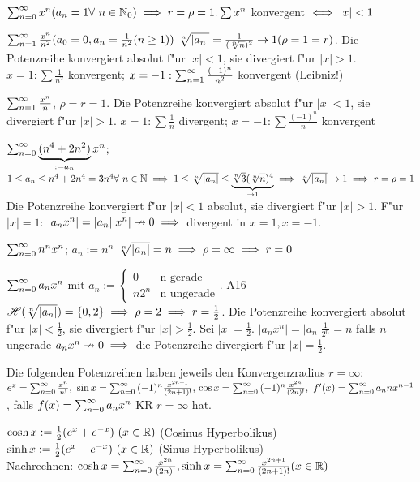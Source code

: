 \documentclass[a4paper,twoside,DIV15,BCOR12mm]{scrbook}
\begin{document}
\begin{beispiele}
\item $\reihenull{x^n} (a_n=1\forall\ n\in\MdN_0)\folgt r=\rho=1. \sum{x^n}$ konvergent $\iff |x|<1$
\item $\sum_{n=1}^{\infty}{\frac{x^n}{n^2}} (a_0=0, a_n=\frac{1}{n^2} (n\ge1))\ \sqrt[n]{|a_n|}=\frac{1}{(\sqrt[n]{n})^2} \to 1 (\rho=1=r)$. Die Potenzreihe konvergiert absolut f"ur $|x|<1$, sie divergiert f"ur $|x|>1$. $x=1: \sum\frac{1}{n^2}$ konvergent; $x=-1: \sum_{n=1}^{\infty}{\frac{(-1)^n}{n^2}}$ konvergent (Leibniz!)
\item $\sum_{n=1}^{\infty}{\frac{x^n}{n}}$, $\rho=r=1$. Die Potenzreihe konvergiert absolut f"ur $|x|<1$, sie divergiert f"ur $|x|>1$. $x=1: \sum{\frac{1}{n}}$ divergent; $x=-1: \sum{\frac{(-1)^n}{n}}$ konvergent
\item $\sum_{n=0}^{\infty}{\underbrace{(n^4+2n^2)}_{:=a_n}x^n}$; $1\le a_n \le n^4+2n^4=3n^4 \forall\ n\in\mathbb{N} \implies 1\le \sqrt[n]{|a_n|} \le \underbrace{\sqrt[n]{3}(\sqrt[n]{n})^4}_{\to 1}
\implies \sqrt[n]{|a_n|} \to 1 \implies r=\rho=1$ Die Potenzreihe konvergiert f"ur $|x|<1$ absolut, sie divergiert f"ur $|x|>1$. F"ur $|x|=1$: $|a_nx^n|=|a_n||x^n| \nrightarrow 0 \implies $ divergent in $x=1, x=-1$.
\item $\sum_{n=0}^{\infty}{n^nx^n}$; $a_n:=n^n$ $\sqrt[n]{|a_n|}=n \implies \rho=\infty \implies r=0$
\item $\sum_{n=0}^{\infty}{a_nx^n}$ mit $a_n:=\begin{cases}
0&\text{n gerade}\\
n2^n&\text{n ungerade}\end{cases}$. A16 \folgt $\mathscr{H}(\sqrt[n]{|a_n|})=\{0, 2\}
\implies \rho=2 \implies r=\frac{1}{2}$. Die Potenzreihe konvergiert absolut f"ur $|x|<\frac{1}{2}$, sie divergiert f"ur $|x|>\frac{1}{2}$. Sei $|x|=\frac{1}{2}$. $|a_nx^n|=|a_n|\frac{1}{2^n}=n$ falls $n$ ungerade \folgt $a_nx^n \nrightarrow 0 \implies$ die Potenzreihe divergiert f"ur $|x|=\frac{1}{2}$.
\end{beispiele}
Die folgenden Potenzreihen haben jeweils den Konvergenzradius $r=\infty:$\\ 
$e^x=\reihenull{\frac{x^n}{n!},\ \sin x=\reihenull{(-1)^n\frac{x^{2n+1}}{(2n+1)!}}},\\ \cos x = \reihenull{(-1)^n\frac{x^{2n}}{(2n)!}},\ f'(x)=\reihenull{a_nnx^{n-1}}$, falls $f(x)=\sum_{n=0}^{\infty}{a_nx^n}$ KR $r=\infty$ hat.

\begin{definition}
$\cosh x:=\frac{1}{2}(e^x+e^{-x})\ (x\in\MdR)$ (Cosinus Hyperbolikus)\\
$\sinh x:=\frac{1}{2}(e^x-e^{-x})\ (x\in\MdR)$ (Sinus Hyperbolikus)\\
Nachrechnen: $\cosh x=\sum_{n=0}^{\infty}{\frac{x^{2n}}{(2n)!}}, 
\sinh x=\sum_{n=0}^{\infty}{\frac{x^{2n+1}}{(2n+1)!}} (x\in\mathbb{R})$
\end{definition}
\end{document}
